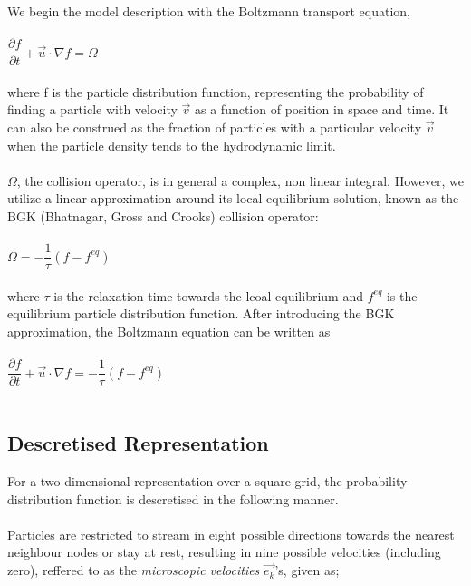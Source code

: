 \documentclass[12pt,a4paper]{report}
\begin{document}
	We begin the model description with the Boltzmann transport equation,\\
	\\
	$
	\dfrac{\partial f}{\partial t} +\vec{u}\cdot \nabla f = \Omega
	$\\
	\\
	where f is the particle distribution function, representing 
	the probability of finding a particle with velocity $\vec{v}$ as a function of position in space and time. It
	can also be construed as the fraction of particles with a particular velocity $\vec{v}$ when the particle density tends to the hydrodynamic limit.\\
	\\
	$\Omega$, the collision operator, is in general a complex, non linear
	integral. However, we utilize a linear approximation around its local equilibrium solution, known as the BGK (Bhatnagar, 
	Gross and Crooks\cite{BGK}) collision operator:\\ 
	\\
	$
		\Omega = -\dfrac{1}{\tau}\left(f - f^{eq}\right)
	$\\
	\\
	where $\tau$ is the relaxation time towards the lcoal equilibrium and	$f^{eq}$ is the equilibrium particle distribution function. After introducing the BGK approximation, the Boltzmann equation can be written as\\
	\\
	$
		\dfrac{\partial f}{\partial t} +\vec{u}\cdot \nabla f = -\dfrac{1}{\tau}\left(f - f^{eq}\right)
	$\\
	\\
			
	\subsection{Descretised Representation}
	For a two dimensional representation over a square grid, 
	the probability distribution function is descretised in the 
	following manner.\\ 
	\\
	Particles are restricted to stream in eight possible
	directions towards the nearest neighbour nodes or stay 
	at rest, resulting in nine possible velocities (including zero), 
	reffered to as the \textit{microscopic velocities} $\vec{e_k}$'s,
	given as;\\   
	
\end{document}
